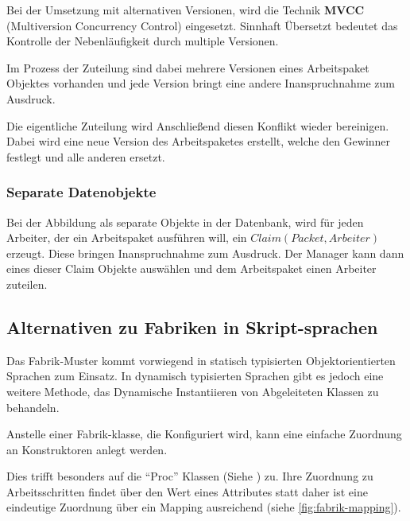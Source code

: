 Bei der Umsetzung mit alternativen Versionen, wird die Technik \textbf{MVCC} (Multiversion Concurrency Control) eingesetzt.
Sinnhaft Übersetzt bedeutet das Kontrolle der Nebenläufigkeit durch multiple Versionen.

Im Prozess der Zuteilung sind dabei mehrere Versionen eines Arbeitspaket Objektes vorhanden und jede Version bringt eine andere Inanspruchnahme zum Ausdruck.

Die eigentliche Zuteilung wird Anschließend diesen Konflikt wieder bereinigen.
Dabei wird eine neue Version des Arbeitspaketes erstellt, welche den Gewinner festlegt und alle anderen ersetzt.

\subsubsection{Separate Datenobjekte}

Bei der Abbildung als separate Objekte in der Datenbank,
wird für jeden Arbeiter, der ein Arbeitspaket ausführen will, ein $Claim(Packet, Arbeiter)$ erzeugt. Diese bringen Inanspruchnahme zum Ausdruck.
Der Manager kann dann eines dieser Claim Objekte auswählen und dem Arbeitspaket einen Arbeiter zuteilen.

\subsection{Alternativen zu Fabriken in Skript-sprachen}

Das Fabrik-Muster kommt vorwiegend in statisch typisierten Objektorientierten Sprachen zum Einsatz. In dynamisch typisierten Sprachen gibt es jedoch eine weitere Methode, das Dynamische Instantiieren von Abgeleiteten Klassen zu behandeln.

Anstelle einer Fabrik-klasse, die Konfiguriert wird,
kann eine einfache Zuordnung an Konstruktoren anlegt werden.

Dies trifft besonders auf die ``Proc'' Klassen (Siehe ) zu.
Ihre Zuordnung zu Arbeitsschritten findet über den Wert eines Attributes statt
daher ist eine eindeutige Zuordnung über ein Mapping ausreichend (siehe \cref{fig:fabrik-mapping}).

